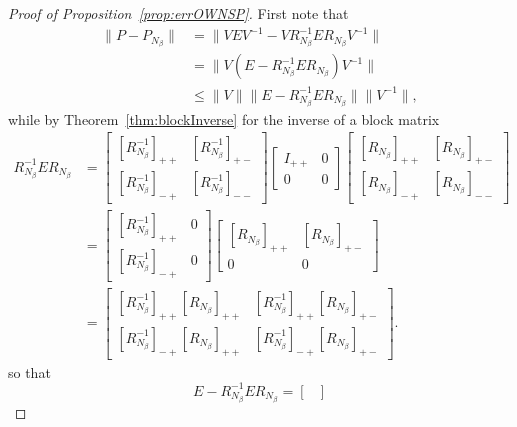 \begin{proof}[Proof of Proposition~\ref{prop:errOWNSP}]
    First note that
    \begin{align*}
    \|P-P_{N_\beta}\|
    &=\|VEV^{-1}-VR_{N_\beta}^{-1}ER_{N_\beta}V^{-1}\|\\
    &=\|V(E-R_{N_\beta}^{-1}ER_{N_\beta})V^{-1}\|\\
    &\leq \|V\| \|E-R_{N_\beta}^{-1}ER_{N_\beta}\| \|V^{-1}\|,
    \end{align*}
    while by Theorem~\ref{thm:blockInverse} for the inverse of a block matrix
    \begin{align*}
        R_{N_\beta}^{-1} E R_{N_\beta}
        &=
        \begin{bmatrix}
            [R_{N_\beta}^{-1}]_{++} & [R_{N_\beta}^{-1}]_{+-}\\
            [R_{N_\beta}^{-1}]_{-+} & [R_{N_\beta}^{-1}]_{--}
        \end{bmatrix}
        \begin{bmatrix}
            I_{++} & 0\\
            0 & 0
        \end{bmatrix}
        \begin{bmatrix}
            [R_{N_\beta}]_{++} & [R_{N_\beta}]_{+-}\\
            [R_{N_\beta}]_{-+} & [R_{N_\beta}]_{--}
        \end{bmatrix}\\
        &=
        \begin{bmatrix}
            [R_{N_\beta}^{-1}]_{++} & 0\\
            [R_{N_\beta}^{-1}]_{-+} & 0
        \end{bmatrix}
        \begin{bmatrix}
            [R_{N_\beta}]_{++} & [R_{N_\beta}]_{+-}\\
            0 & 0
        \end{bmatrix}\\
        &=
        \begin{bmatrix}
            [R_{N_\beta}^{-1}]_{++}[R_{N_\beta}]_{++} &
            [R_{N_\beta}^{-1}]_{++}[R_{N_\beta}]_{+-}\\
            [R_{N_\beta}^{-1}]_{-+}[R_{N_\beta}]_{++} &
            [R_{N_\beta}^{-1}]_{-+}[R_{N_\beta}]_{+-}
        \end{bmatrix}.
    \end{align*}
    so that
    \[
    E-R_{N_\beta}^{-1}E R_{N_\beta}
    =
    \begin{bmatrix}

\end{bmatrix}\]
\end{proof}
